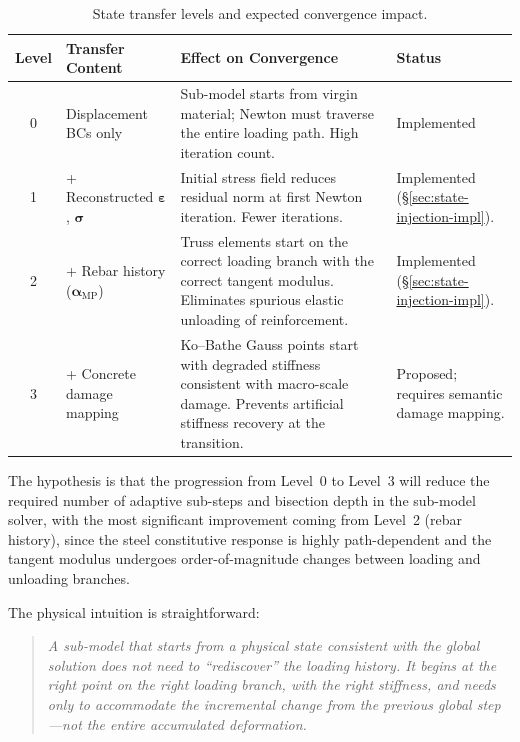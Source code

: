 \begin{table}[htbp]
\centering
\caption{State transfer levels and expected convergence impact.}
\label{tab:transfer-levels}
\begin{tabular}{@{}clp{5.5cm}p{4.5cm}@{}}
\toprule
\textbf{Level} & \textbf{Transfer Content} & \textbf{Effect on Convergence} & \textbf{Status} \\
\midrule
0 & Displacement BCs only
  & Sub-model starts from virgin material; Newton must traverse the
    entire loading path.  High iteration count.
  & Implemented \\
1 & + Reconstructed $\boldsymbol{\varepsilon}$, $\boldsymbol{\sigma}$
  & Initial stress field reduces residual norm at first Newton
    iteration.  Fewer iterations.
  & Implemented (\S\ref{sec:state-injection-impl}). \\
2 & + Rebar history ($\boldsymbol{\alpha}_{\text{MP}}$)
  & Truss elements start on the correct loading branch with the
    correct tangent modulus.
    Eliminates spurious elastic unloading of reinforcement.
  & Implemented (\S\ref{sec:state-injection-impl}). \\
3 & + Concrete damage mapping
  & Ko--Bathe Gauss points start with degraded stiffness consistent
    with macro-scale damage.  Prevents artificial stiffness
    recovery at the transition.
  & Proposed; requires semantic damage mapping. \\
\bottomrule
\end{tabular}
\end{table}

The hypothesis is that the progression from Level~0 to Level~3
will reduce the required number of adaptive sub-steps and bisection
depth in the sub-model solver, with the most significant improvement
coming from Level~2 (rebar history), since the steel constitutive
response is highly path-dependent and the tangent modulus undergoes
order-of-magnitude changes between loading and unloading branches.

The physical intuition is straightforward:
\begin{quote}
\itshape
A sub-model that starts from a physical state consistent with the
global solution does not need to ``rediscover'' the loading history.
It begins at the right point on the right loading branch, with the
right stiffness, and needs only to accommodate the \emph{incremental}
change from the previous global step---not the entire accumulated
deformation.
\end{quote}


